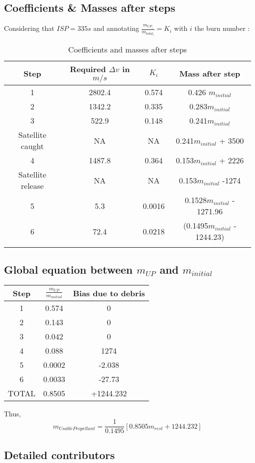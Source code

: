 \subsection{Coefficients \& Masses after steps}

Considering that \(ISP = 335s\) and annotating
\(\frac{m_{UP_i}}{m_{total_i}} = K_i\) with \(i\) the burn number :

\begin{longtable}[]{@{}cccc@{}}
\toprule
Step & Required \(\Delta v\) in \(m/s\) & \(K_i\) & Mass after
step\tabularnewline
\midrule
\endhead
1 & 2802.4 & 0.574 & 0.426 \(m_{initial}\)\tabularnewline
2 & 1342.2 & 0.335 & 0.283\(m_{initial}\)\tabularnewline
3 & 522.9 & 0.148 & 0.241\(m_{initial}\)\tabularnewline
Satellite caught & NA & NA & 0.241\(m_{initial}\) + 3500\tabularnewline
4 & 1487.8 & 0.364 & 0.153\(m_{initial}\) + 2226\tabularnewline
Satellite release & NA & NA & 0.153\(m_{initial}\) -1274\tabularnewline
5 & 5.3 & 0.0016 & 0.1528\(m_{initial}\) - 1271.96\tabularnewline
6 & 72.4 & 0.0218 & (0.1495$m_{initial}$ - 1244.23)\tabularnewline
\bottomrule
\caption{Coefficients and masses after steps}
\end{longtable}


\subsection{\texorpdfstring{Global equation between \(m_{UP}\) and
		\(m_{initial}\)}{Global equation between m\_\{UP\} and m\_\{initial\}}}



\begin{longtable}[]{@{}ccc@{}}
\toprule
Step & \(\frac{m_{UP}}{m_{initial}}\) & Bias due to
debris\tabularnewline
\midrule
\endhead
1 & 0.574 & 0\tabularnewline
2 & 0.143 & 0\tabularnewline
3 & 0.042 & 0\tabularnewline
4 & 0.088 & 1274\tabularnewline
5 & 0.0002 & -2.038\tabularnewline
6 & 0.0033 & -27.73\tabularnewline
TOTAL & 0.8505 & +1244.232\tabularnewline
\bottomrule
\end{longtable}
Thus,
$$
m_{UsablePropellant} = \frac 1{0.1495}[0.8505m_{rest}+1244.232]
$$
\subsection{Detailed contributors}

